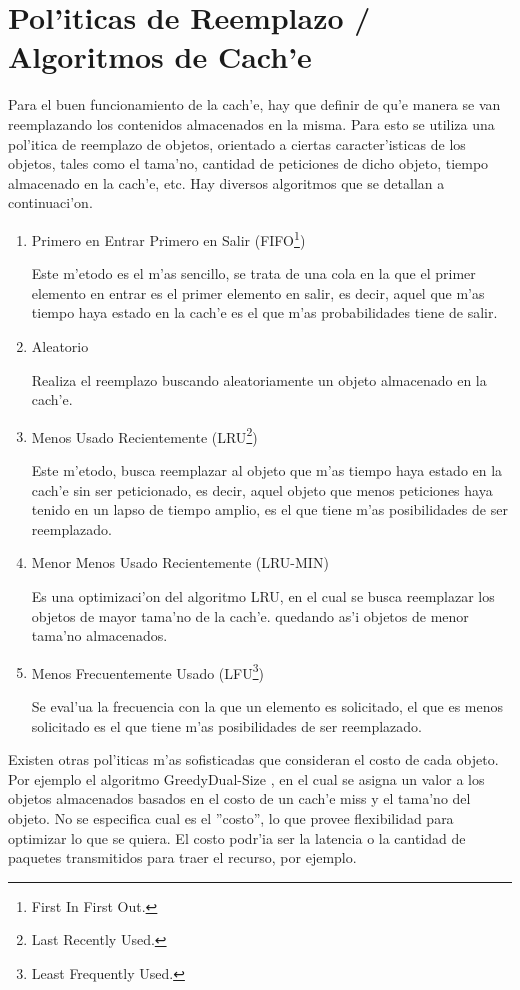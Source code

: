 \section{Pol'iticas de Reemplazo / Algoritmos de Cach'e}
\label{politicasReemplazo}
Para el buen funcionamiento de la cach'e, hay que definir de qu'e manera se van reemplazando los contenidos almacenados en la misma. Para esto se utiliza una pol'itica de reemplazo de objetos, orientado a ciertas caracter'isticas de los objetos, tales como el tama'no, cantidad de peticiones de dicho objeto, tiempo almacenado en la cach'e, etc.
Hay diversos algoritmos que se detallan a continuaci'on.
\begin{enumerate}
\item Primero en Entrar Primero en Salir (FIFO\footnote{First In First Out.})

Este m'etodo es el m'as sencillo, se trata de una cola en la que el primer elemento en entrar es el primer elemento en salir, es decir, aquel que m'as tiempo haya estado en la cach'e es el que m'as probabilidades tiene de salir.
\clearpage
\item Aleatorio

Realiza el reemplazo buscando aleatoriamente un objeto almacenado en la cach'e.
\item Menos Usado Recientemente (LRU\footnote{Last Recently Used.})

Este m'etodo, busca reemplazar al objeto que m'as tiempo haya estado en la cach'e sin ser peticionado, es decir, aquel objeto que menos peticiones haya tenido en un lapso de tiempo amplio, es el que tiene m'as posibilidades de ser reemplazado.
\item Menor Menos Usado Recientemente (LRU-MIN)

Es una optimizaci'on del algoritmo LRU, en el cual se busca reemplazar los objetos de mayor tama'no de la cach'e. quedando as'i objetos de menor tama'no almacenados.
\item Menos Frecuentemente Usado (LFU\footnote{Least Frequently Used.})

Se eval'ua la frecuencia con la que un elemento es solicitado, el que es menos solicitado es el que tiene m'as posibilidades de ser reemplazado.
\end{enumerate}

Existen otras pol'iticas m'as sofisticadas que consideran el costo de cada objeto. Por ejemplo el algoritmo GreedyDual-Size \citep{webCaching}, en el cual se asigna un valor a los objetos almacenados basados en el costo de un cach'e miss y el tama'no del objeto. No se especifica cual es el ''costo'', lo que provee flexibilidad para optimizar lo que se quiera. El costo podr'ia ser la latencia o la cantidad de paquetes transmitidos para traer el recurso, por ejemplo.

